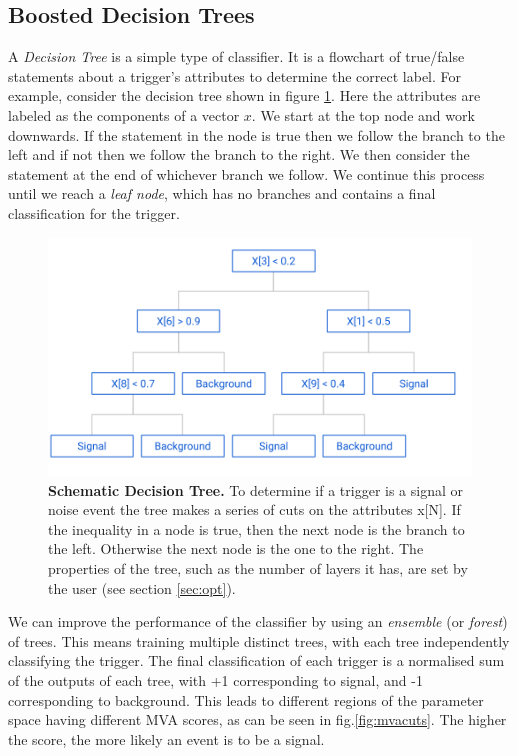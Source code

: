 \documentclass[11pt]{cuthesis}
\begin{document}
\subsection{Boosted Decision Trees} \label{bdt}
A \textit{Decision Tree} is a simple type of classifier. It is a flowchart of true/false statements about a trigger's attributes to determine the correct label. For example, consider the decision tree shown in figure \ref{fig:tree}. Here the attributes are labeled as the components of a vector $x$. We start at the top node and work downwards. If the statement in the node is true then we follow the branch to the left and if not then we follow the branch to the right. We then consider the statement at the end of whichever branch we follow. We continue this process until we reach a \textit{leaf node}, which has no branches and contains a final classification for the trigger.  
\begin{figure} %
\begin{center}
\includegraphics[width=0.8\linewidth]{decision_tree.png}
\end{center}
\caption{\textbf{Schematic Decision Tree.} To determine if a trigger is a signal or noise event the tree makes a series of cuts on the attributes x[N]. If the inequality in a node is true, then the next node is the branch to the left. Otherwise the next node is the one to the right. The properties of the tree, such as the number of layers it has, are set by the user (see section \ref{sec:opt}). }
\label{fig:tree}
\end{figure}

We can improve the performance of the classifier by using an \textit{ensemble} (or \textit{forest}) of trees. This means training multiple distinct trees, with each tree independently classifying the trigger. The final classification of each trigger is a normalised sum of the outputs of each tree, with +1 corresponding to signal, and -1 corresponding to background. This leads to different regions of the parameter space having different MVA scores, as can be seen in fig.\ref{fig:mvacuts}. The higher the score, the more likely an event is to be a signal. 
\end{document}
